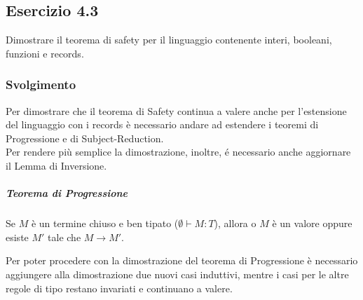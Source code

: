 	 
\subsection*{Esercizio 4.3}
Dimostrare il teorema di safety per il linguaggio contenente interi, booleani, funzioni e records.

\subsubsection*{Svolgimento}
Per dimostrare che il teorema di Safety continua a valere anche per l'estensione del linguaggio con i records \`e necessario andare ad estendere i teoremi di Progressione e di Subject-Reduction.\\
Per rendere pi\`u semplice la dimostrazione, inoltre, \'e necessario anche aggiornare il Lemma di Inversione.

\subparagraph{Teorema di Progressione}

\begin{centering}
	Se $M$ \`e un termine chiuso e ben tipato ($\emptyset \vdash  M : T$), allora o $M$ \`e un valore oppure esiste $M'$ tale che $M \to M'$.
\end{centering}

\noindent Per poter procedere con la dimostrazione del teorema di Progressione \`e necessario aggiungere alla dimostrazione due nuovi casi induttivi, mentre i casi per le altre regole di tipo restano invariati e continuano a valere.


